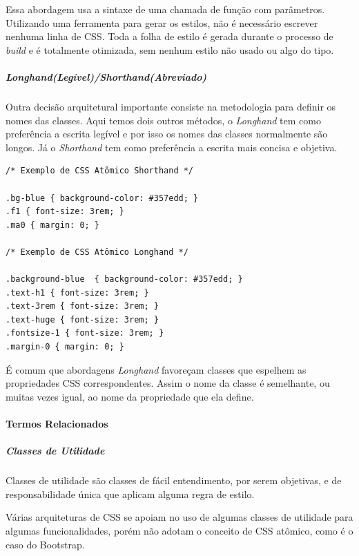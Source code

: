Essa abordagem usa a sintaxe de uma chamada de função com parâmetros.
Utilizando uma ferramenta para gerar os estilos, não é necessário
escrever nenhuma linha de CSS. Toda a folha de estilo é gerada durante o
processo de \emph{build} e é totalmente otimizada, sem nenhum estilo não
usado ou algo do tipo.

\hypertarget{longhandleguxedvelshorthandabreviado}{%
\subparagraph{\texorpdfstring{\emph{Longhand}(Legível)/\emph{Shorthand}(Abreviado)}{Longhand(Legível)/Shorthand(Abreviado)}}\label{longhandleguxedvelshorthandabreviado}}

Outra decisão arquitetural importante consiste na metodologia para
definir os nomes das classes. Aqui temos dois outros métodos, o
\emph{Longhand} tem como preferência a escrita legível e por isso os
nomes das classes normalmente são longos. Já o \emph{Shorthand} tem como
preferência a escrita mais concisa e objetiva.

\begin{verbatim}
/* Exemplo de CSS Atômico Shorthand */

.bg-blue { background-color: #357edd; }
.f1 { font-size: 3rem; }
.ma0 { margin: 0; }

/* Exemplo de CSS Atômico Longhand */

.background-blue  { background-color: #357edd; }
.text-h1 { font-size: 3rem; }
.text-3rem { font-size: 3rem; }
.text-huge { font-size: 3rem; }
.fontsize-1 { font-size: 3rem; }
.margin-0 { margin: 0; }
\end{verbatim}

É comum que abordagens \emph{Longhand} favoreçam classes que espelhem as
propriedades CSS correspondentes. Assim o nome da classe é semelhante,
ou muitas vezes igual, ao nome da propriedade que ela define.

\hypertarget{termos-relacionados}{%
\paragraph{Termos Relacionados}\label{termos-relacionados}}

\hypertarget{classes-de-utilidade}{%
\subparagraph{Classes de Utilidade}\label{classes-de-utilidade}}

Classes de utilidade são classes de fácil entendimento, por serem
objetivas, e de responsabilidade única que aplicam alguma regra de
estilo.

Várias arquiteturas de CSS se apoiam no uso de algumas classes de
utilidade para algumas funcionalidades, porém não adotam o conceito de
CSS atômico, como é o caso do Bootstrap.

